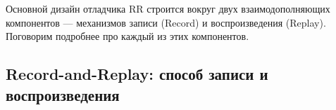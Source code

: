Основной дизайн отладчика RR строится вокруг двух взаимодополняющих компонентов
— механизмов записи (Record) и воспроизведения (Replay). Поговорим подробнее
про каждый из этих компонентов.


\subsection{Record-and-Replay: способ записи и воспроизведения}





